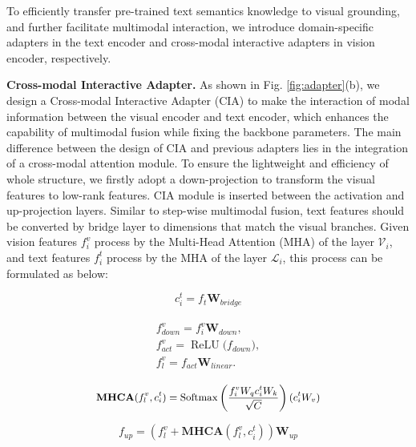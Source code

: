 To efficiently transfer pre-trained text semantics knowledge to visual grounding, and further facilitate multimodal interaction, we introduce domain-specific adapters in the text encoder and cross-modal interactive adapters in vision encoder, respectively.

\noindent
\textbf{Cross-modal Interactive Adapter.}
As shown in Fig. \ref{fig:adapter}(b), we design a Cross-modal Interactive Adapter (CIA) to make the interaction of modal information between the visual encoder and text encoder, which enhances the capability of multimodal fusion while fixing the backbone parameters. The main difference between the design of CIA and previous adapters lies in the integration of a cross-modal attention module. To ensure the lightweight and efficiency of whole structure, we firstly adopt a down-projection to transform the visual features to low-rank features. CIA module is inserted between the activation and up-projection layers. Similar to step-wise multimodal fusion, text features should be converted by bridge layer to dimensions that match the visual branches. Given vision features $f_i^v$ process by the Multi-Head Attention (MHA) of the layer $\mathcal{V}_{i}$, and text features $f_i^t$ process by the MHA of the layer $\mathcal{L}_{i}$, this process can be formulated as below:

\begin{equation}
c_i^t = f_t\mathbf{W}_{bridge}
\end{equation}



\begin{equation}
\begin{aligned}
\begin{split}
    f_{down}^v = f_i^v\mathbf{W}_{down}, \\
    f_{act}^v=\operatorname{ReLU}\boldsymbol(f_{down}), \\
    f_{l}^v = f_{act}\mathbf{W}_{linear}.
\end{split}
\end{aligned}
\end{equation}

\begin{equation}
\small
\begin{aligned}
\mathbf{MHCA}(f_{l}^v,c_i^t)=\operatorname{Softmax}\left(\frac{f_i^vW_qc_i^tW_k}{\sqrt{C}}\right)(c_i^tW_v)
\end{aligned}
\end{equation}


\begin{equation}
f_{up} = (f_{l}^v+\mathbf{MHCA}(f_{l}^v,c_i^t))\mathbf{W}_{up}
\end{equation}

